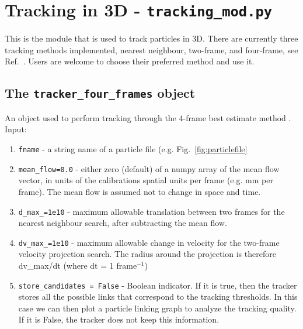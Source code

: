 \documentclass[10pt,a4paper]{article}
\begin{document}
\section{Tracking in 3D - \texttt{tracking\_mod.py}}

This is the module that is used to track particles in 3D. There are currently three tracking methods implemented, nearest neighbour, two-frame, and four-frame, see Ref.~\cite{Ouellette2006}. Users are welcome to choose their preferred method and use it.



\subsection{The \texttt{tracker\_four\_frames} object}\label{sec:four_frames}

An object used to perform tracking through the 4-frame best estimate method \cite{Ouellette2006}. Input:
%
\begin{enumerate}
	\item \texttt{fname} - a string name of a particle file (e.g. Fig.~\ref{fig:particlefile}
	\item \texttt{mean\_flow=0.0} - either zero (default) of a numpy array of the mean flow vector, in units of the calibrations spatial units per frame (e.g. mm per frame). The mean flow is assumed not to change in space and time.
	\item \texttt{d\_max\_=1e10} - maximum allowable translation between two frames for the nearest neighbour search, after subtracting the mean flow. 
	\item \texttt{dv\_max\_=1e10} - maximum allowable change in velocity for the two-frame velocity projection search. The radius around the projection is therefore dv\_max/dt (where dt = 1 frame$^{-1}$)
	\item \texttt{store\_candidates = False} - Boolean indicator. If it is true, then the tracker stores all the possible links that correspond to the tracking thresholds. In this case we can then plot a particle linking graph to analyze the tracking quality. If it is False, the tracker does not keep this information.  
\end{enumerate}
\end{document}
